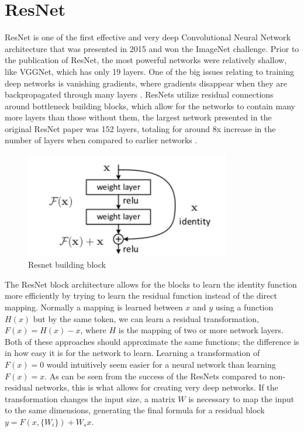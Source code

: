 \section{ResNet}
ResNet is one of the first effective and very deep Convolutional Neural Network architecture that was presented in 2015 and won the ImageNet challenge. Prior to the publication of ResNet, the most powerful networks were relatively shallow, like VGGNet, which has only 19 layers. One of the big issues relating to training deep networks is vanishing gradients, where gradients disappear when they are backpropagated through many layers \citep{wideResNet}. ResNets utilize residual connections around bottleneck building blocks, which allow for the networks to contain many more layers than those without them, the largest network presented in the original ResNet paper was 152 layers, totaling for around 8x increase in the number of layers when compared to earlier networks \citep{resNet}.

\begin{figure}[h!] 
\centering 
\includegraphics[width=0.8\textwidth]{imgs/resnet-block.png}
\caption{Resnet building block \citep{resNet}}
\end{figure}

The ResNet block architecture allows for the blocks to learn the identity function more efficiently by trying to learn the residual function instead of the direct mapping. Normally a mapping is learned between ${x}$ and ${y}$ using a function ${H(x)}$ but by the same token, we can learn a residual transformation, ${F(x) = H(x) - x}$, where ${H}$ is the mapping of two or more network layers. Both of these approaches should approximate the same functions; the difference is in how easy it is for the network to learn. Learning a transformation of ${F(x) = 0}$ would intuitively seem easier for a neural network than learning ${F(x) = x}$. As can be seen from the success of the ResNets compared to non-residual networks, this is what allows for creating very deep networks. If the transformation changes the input size, a matrix ${W}$ is necessary to map the input to the same dimensions, generating the final formula for a residual block ${y = F(x, \{W_i\}) + W_s x}$.


